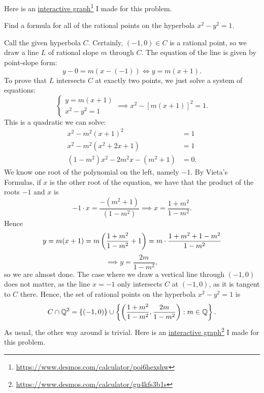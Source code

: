 \documentclass{article}
\begin{document}
\begin{solution}
Here is an \href{https://www.desmos.com/calculator/poi6hexshw}{interactive graph}\footnote{\url{https://www.desmos.com/calculator/poi6hexshw}} I made for this problem.
\end{solution}

\begin{exercise}[Chapter 3 \#3]
Find a formula for all of the rational points on the hyperbola $x^2-y^2=1$.
\end{exercise}
\begin{solution}
Call the given hyperbola $C$. Certainly, $(-1,0) \in C$ is a rational point, so we draw a line $L$ of rational slope $m$ through $C$. The equation of the line is given by point-slope form:
$$y-0 = m(x-(-1)) \iff  y = m(x+1).$$
To prove that $L$ intersects $C$ at exactly two points, we just solve a system of equations: \newpage
$$\begin{cases}
    y = m(x+1) \\
    x^2-y^2=1
\end{cases} \implies x^2 - [m(x+1)]^2 = 1.$$
This is a quadratic we can solve:
\begin{align*}
x^2 - m^2(x+1)^2 &= 1 \\
x^2 - m^2(x^2+2x+1) &= 1 \\
(1-m^2)x^2 - 2m^2x - (m^2+1) &= 0.
\end{align*}
We know one root of the polynomial on the left, namely $-1$. By Vieta's Formulas, if $x$ is the other root of the equation, we have that the product of the roots $-1$ and $x$ is
$$-1\cdot x= \frac{-(m^2+1)}{(1-m^2)} \implies x = \frac{1+m^2}{1-m^2}.$$
Hence
$$y = m(x+1) = m\left(\frac{1+m^2}{1-m^2}+1 \right) = m\cdot \frac{1+m^2+1-m^2}{1-m^2}$$
$$\implies y = \frac{2m}{1-m^2},$$
so we are almost done. The case where we draw a vertical line through $(-1,0)$ does not matter, as the line $x=-1$ only intersects $C$ at $(-1,0)$, as it is tangent to $C$ there. Hence, the set of rational points on the hyperbola $x^2-y^2=1$ is
$$C\cap \mathbb Q^2 = \left\{(-1,0)\right\} \cup \left\{\left(\frac{1+m^2}{1-m^2}, \frac{2m}{1-m^2} \right): m\in\mathbb Q\right\}.$$
As usual, the other way around is trivial. Here is an \href{https://www.desmos.com/calculator/gu4kfs3b1s}{interactive graph}\footnote{\url{https://www.desmos.com/calculator/gu4kfs3b1s}} I made for this problem.
\end{solution}
\end{document}

